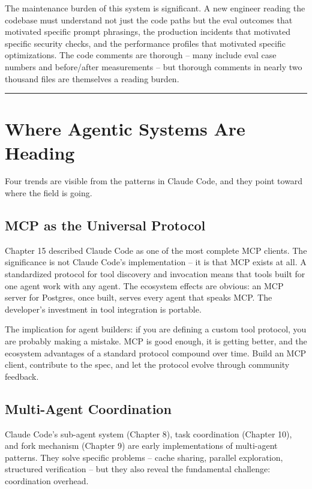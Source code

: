 \documentclass[
  english,
  11pt,
  letterpaper,
]{book}
\begin{document}
The maintenance burden of this system is significant. A new engineer
reading the codebase must understand not just the code paths but the
eval outcomes that motivated specific prompt phrasings, the production
incidents that motivated specific security checks, and the performance
profiles that motivated specific optimizations. The code comments are
thorough -- many include eval case numbers and before/after measurements
-- but thorough comments in nearly two thousand files are themselves a
reading burden.

\begin{center}\rule{0.5\linewidth}{0.5pt}\end{center}

\section{Where Agentic Systems Are
Heading}\label{where-agentic-systems-are-heading}

Four trends are visible from the patterns in Claude Code, and they point
toward where the field is going.

\subsection{MCP as the Universal
Protocol}\label{mcp-as-the-universal-protocol}

Chapter 15 described Claude Code as one of the most complete MCP
clients. The significance is not Claude Code's implementation -- it is
that MCP exists at all. A standardized protocol for tool discovery and
invocation means that tools built for one agent work with any agent. The
ecosystem effects are obvious: an MCP server for Postgres, once built,
serves every agent that speaks MCP. The developer's investment in tool
integration is portable.

The implication for agent builders: if you are defining a custom tool
protocol, you are probably making a mistake. MCP is good enough, it is
getting better, and the ecosystem advantages of a standard protocol
compound over time. Build an MCP client, contribute to the spec, and let
the protocol evolve through community feedback.

\subsection{Multi-Agent Coordination}\label{multi-agent-coordination}

Claude Code's sub-agent system (Chapter 8), task coordination (Chapter
10), and fork mechanism (Chapter 9) are early implementations of
multi-agent patterns. They solve specific problems -- cache sharing,
parallel exploration, structured verification -- but they also reveal
the fundamental challenge: coordination overhead.
\end{document}
